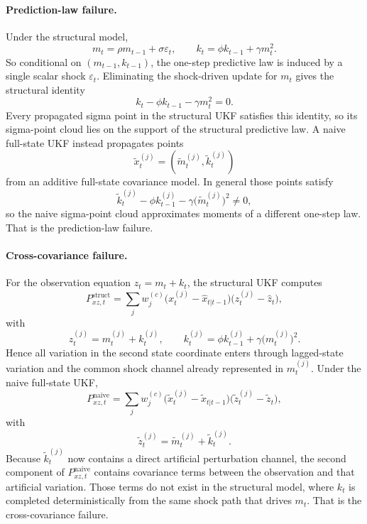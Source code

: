 \paragraph{Prediction-law failure.}
Under the structural model,
\begin{equation}
  m_t = \rho m_{t-1} + \sigma \varepsilon_t,
  \qquad
  k_t = \phi k_{t-1} + \gamma m_t^2.
\end{equation}
So conditional on $(m_{t-1},k_{t-1})$, the one-step predictive law is induced by
a single scalar shock $\varepsilon_t$.  Eliminating the shock-driven update for
$m_t$ gives the structural identity
\begin{equation}
  k_t - \phi k_{t-1} - \gamma m_t^2 = 0.
  \label{eq:bf-ukf-structural-identity}
\end{equation}
Every propagated sigma point in the structural UKF satisfies this identity, so
its sigma-point cloud lies on the support of the structural predictive law.  A
naive full-state UKF instead propagates points
\[
  \tilde x_t^{(j)}=(\tilde m_t^{(j)},\tilde k_t^{(j)})
\]
from an additive full-state covariance model.  In general those points satisfy
\begin{equation}
  \tilde k_t^{(j)} - \phi k_{t-1}^{(j)} - \gamma \bigl(\tilde m_t^{(j)}\bigr)^2
  \neq 0,
\end{equation}
so the naive sigma-point cloud approximates moments of a different one-step law.
That is the prediction-law failure.

\paragraph{Cross-covariance failure.}
For the observation equation $z_t=m_t+k_t$, the structural UKF computes
\[
  P_{xz,t}^{\mathrm{struct}}
  =
  \sum_j w_j^{(c)}
  \bigl(x_t^{(j)}-\hat x_{t|t-1}\bigr)
  \bigl(z_t^{(j)}-\hat z_t\bigr),
\]
with
\[
  z_t^{(j)} = m_t^{(j)} + k_t^{(j)},
  \qquad
  k_t^{(j)} = \phi k_{t-1}^{(j)} + \gamma \bigl(m_t^{(j)}\bigr)^2.
\]
Hence all variation in the second state coordinate enters through lagged-state
variation and the common shock channel already represented in $m_t^{(j)}$.
Under the naive full-state UKF,
\[
  P_{xz,t}^{\mathrm{naive}}
  =
  \sum_j w_j^{(c)}
  \bigl(\tilde x_t^{(j)}-\tilde x_{t|t-1}\bigr)
  \bigl(\tilde z_t^{(j)}-\tilde z_t\bigr),
\]
with
\[
  \tilde z_t^{(j)} = \tilde m_t^{(j)} + \tilde k_t^{(j)}.
\]
Because $\tilde k_t^{(j)}$ now contains a direct artificial perturbation channel,
the second component of $P_{xz,t}^{\mathrm{naive}}$ contains covariance terms
between the observation and that artificial variation.  Those terms do not exist
in the structural model, where $k_t$ is completed deterministically from the
same shock path that drives $m_t$.  That is the cross-covariance failure.

